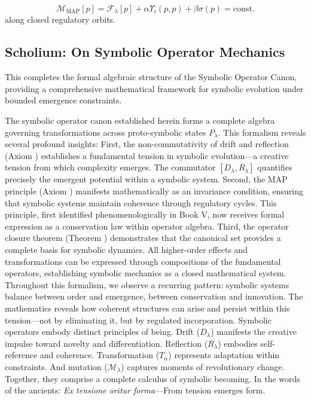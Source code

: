 \begin{proposition}
\label{prop:bk6_map_invariant}
\begin{equation}
\mathcal{M}_{\text{MAP}}[p] = \mathcal{F}_\lambda[p] + \alpha \Upsilon_i(p,p) + \beta \sigma(p) = \text{const.}
\end{equation}
along closed regulatory orbits.
\end{proposition}
\subsection{Scholium: On Symbolic Operator Mechanics}
\label{subsection:bk6_scholium_on_symbolic_operator_mechanics}
This completes the formal algebraic structure of the Symbolic Operator Canon, providing a comprehensive mathematical framework for symbolic evolution under bounded emergence constraints.

The symbolic operator canon established herein forms a complete algebra governing transformations across proto-symbolic states $P_\lambda$. This formalism reveals several profound insights:
First, the non-commutativity of drift and reflection (Axiom ) establishes a fundamental tension in symbolic evolution—a creative tension from which complexity emerges. The commutator $[D_\lambda, R_\lambda]$ quantifies precisely the emergent potential within a symbolic system.
Second, the MAP principle (Axiom ) manifests mathematically as an invariance condition, ensuring that symbolic systems maintain coherence through regulatory cycles. This principle, first identified phenomenologically in Book V, now receives formal expression as a conservation law within operator algebra.
Third, the operator closure theorem (Theorem ) demonstrates that the canonical set provides a complete basis for symbolic dynamics. All higher-order effects and transformations can be expressed through compositions of the fundamental operators, establishing symbolic mechanics as a closed mathematical system.
Throughout this formalism, we observe a recurring pattern: symbolic systems balance between order and emergence, between conservation and innovation. The mathematics reveals how coherent structures can arise and persist within this tension—not by eliminating it, but by regulated incorporation.
Symbolic operators embody distinct principles of being. Drift ($D_\lambda$) manifests the creative impulse toward novelty and differentiation. Reflection ($R_\lambda$) embodies self-reference and coherence. Transformation ($T_\alpha$) represents adaptation within constraints. And mutation ($\mathcal{M}_\lambda$) captures moments of revolutionary change. Together, they comprise a complete calculus of symbolic becoming.
In the words of the ancients: \textit{Ex tensione oritur forma}—From tension emerges form.

